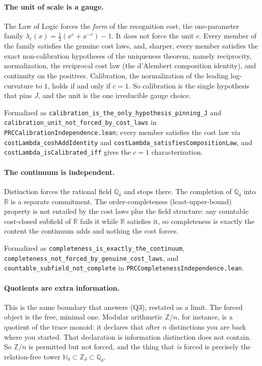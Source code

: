 \documentclass[11pt,a4paper]{article}
\theoremstyle{definition}
\theoremstyle{remark}
\newcommand{\Nd}{\mathbb{N}_\delta}
\newcommand{\Zd}{\mathbb{Z}_\delta}
\newcommand{\Qd}{\mathbb{Q}_\delta}
\newcommand{\code}[1]{\texttt{\small #1}}
\begin{document}
\paragraph{The unit of scale is a gauge.} The Law of Logic forces the
\emph{form} of the recognition cost, the one-parameter family
$\lambda_c(x) = \tfrac{1}{2}(x^{c} + x^{-c}) - 1$. It does not force the unit
$c$. Every member of the family satisfies the genuine cost laws, and, sharper,
every member satisfies the exact non-calibration hypotheses of the uniqueness
theorem, namely reciprocity, normalization, the reciprocal cost law (the
d'Alembert composition identity), and continuity on the positives. Calibration,
the normalization of the leading log-curvature to $1$, holds if and only if
$c=1$. So calibration is the single hypothesis that pins $J$, and the unit is the
one irreducible gauge choice.

Formalized as \code{calibration\_is\_the\_only\_hypothesis\_pinning\_J} and
\code{calibration\_unit\_not\_forced\_by\_cost\_laws} in
\code{PRCCalibrationIndependence.lean}; every member satisfies the cost law via
\code{costLambda\_coshAddIdentity} and
\code{costLambda\_satisfiesCompositionLaw}, and
\code{costLambda\_isCalibrated\_iff} gives the $c=1$ characterization.

\paragraph{The continuum is independent.} Distinction forces the rational field
$\Qd$ and stops there. The completion of $\Qd$ into $\mathbb{R}$ is a separate
commitment. The order-completeness (least-upper-bound) property is not entailed
by the cost laws plus the field structure: any countable cost-closed subfield of
$\mathbb{R}$ fails it while $\mathbb{R}$ satisfies it, so completeness is exactly
the content the continuum adds and nothing the cost forces.

Formalized as \code{completeness\_is\_exactly\_the\_continuum},
\code{completeness\_not\_forced\_by\_genuine\_cost\_laws}, and
\code{countable\_subfield\_not\_complete} in
\code{PRCCompletenessIndependence.lean}.

\paragraph{Quotients are extra information.} This is the same boundary that
answers (Q3), restated as a limit. The forced object is the free, minimal one.
Modular arithmetic $\mathbb{Z}/n$, for instance, is a quotient of the trace
monoid: it declares that after $n$ distinctions you are back where you started.
That declaration is information distinction does not contain. So $\mathbb{Z}/n$
is permitted but not forced, and the thing that \emph{is} forced is precisely the
relation-free tower $\Nd \subset \Zd \subset \Qd$.
\end{document}
